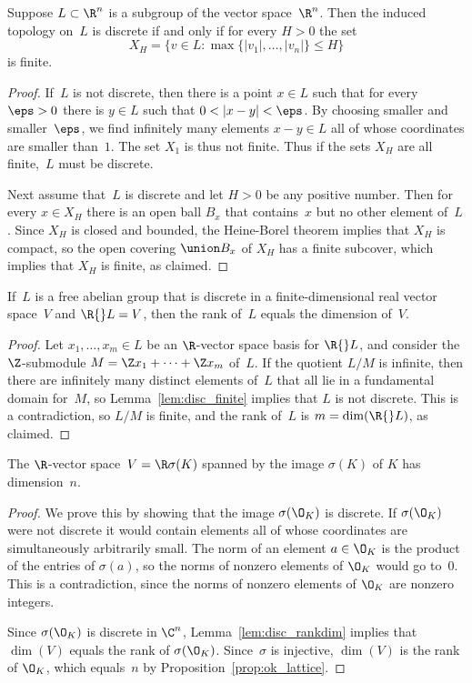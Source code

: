 \begin{lemma}\label{lem:disc_finite}
Suppose $L\subset \R^n$ is a subgroup of the vector space~$\R^n$.
Then the induced topology on~$L$ is discrete if and only
if for every  $H>0$ the set
$$
  X_H = \{v \in L : \max\{|v_1|,\ldots, |v_n|\} \leq H \}
$$
is finite.
\end{lemma}
\begin{proof}
If~$L$ is not discrete, then there is a point $x \in L$ such that
for every $\eps>0$ there is $y\in L$ such that
$0 < |x-y|<\eps$. By choosing smaller and smaller~$\eps$,
we find infinitely many elements $x-y\in L$
all of whose coordinates are smaller than~$1$.
The set $X_1$ is thus not finite.   Thus if the sets
$X_H$ are all finite,~$L$ must be discrete.

Next assume that~$L$ is discrete and let $H>0$ be any positive number.
Then for every $x\in X_H$ there is an open ball $B_x$ that
contains~$x$ but no other element of~$L$.  Since $X_H$ is closed and
bounded, the Heine-Borel theorem implies that $X_H$ is compact, so the
open covering $\union B_x$ of $X_H$ has a finite subcover, which
implies that $X_H$ is finite, as claimed.
\end{proof}

\begin{lemma}\label{lem:disc_rankdim}
If~$L$ is a free abelian group that is
discrete in a finite-dimensional
real vector space~$V$ and $\R{}L=V$, then the rank of~$L$
equals the dimension of~$V$.
\end{lemma}
\begin{proof}
  Let $x_1,\ldots, x_m \in L$ be an $\R$-vector space basis for
  $\R{}L$, and consider the $\Z$-submodule $M=\Z x_1 + \cdots + \Z
  x_m$ of~$L$.  If the quotient $L/M$ is infinite, then there are
  infinitely many distinct elements of~$L$ that all lie in a
  fundamental domain for~$M$, so Lemma~\ref{lem:disc_finite} implies
  that $L$ is not discrete.  This is a contradiction, so $L/M$ is
  finite, and the rank of~$L$ is $m=\dim(\R{}L)$, as claimed.
\end{proof}

\begin{proposition}
The $\R$-vector space~$V=\R\sigma(K)$ spanned by the image
$\sigma(K)$ of $K$ has dimension~$n$.
\end{proposition}
\begin{proof}
We prove this by showing that the image $\sigma(\O_K)$ is discrete. If
$\sigma(\O_K)$ were not discrete it would contain elements all of
whose coordinates are simultaneously arbitrarily small.  The norm of
an element $a\in \O_K$ is the product of the entries of $\sigma(a)$,
so the norms of nonzero elements of $\O_K$ would go to~$0$.  This is a
contradiction, since the norms of nonzero elements of $\O_K$ are
 nonzero integers.

Since $\sigma(\O_K)$ is discrete in $\C^n$, Lemma~\ref{lem:disc_rankdim}
implies that $\dim(V)$ equals the rank of $\sigma(\O_K)$.  Since~$\sigma$
is injective, $\dim(V)$ is the rank of $\O_K$, which equals~$n$ by
Proposition~\ref{prop:ok_lattice}.
\end{proof}

